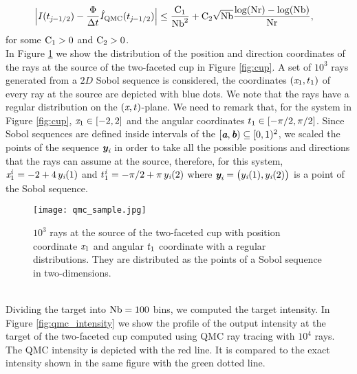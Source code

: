\begin{equation} \begin{aligned}
\Big|I(t_{\textit{j}-1/2})&-\frac{\Phi}
{\Delta t}\hat{I}_{\textrm{QMC}}(t_{\textit{j}-1/2})\Big| \leq
\frac{\textrm{C}_1}{\textrm{Nb}^2} + \textrm{C}_2\sqrt{\textrm{Nb}}\frac{\log(\textrm{Nr})-\log(\textrm{Nb})}{\textrm{Nr}},
\end{aligned}
\end{equation}
for some $\textrm{C}_1>0$ and $\textrm{C}_2>0$.
\\ \indent
In Figure \ref{fig:qmc_sample1} we show the distribution of the position and direction coordinates of the rays at the source of the two-faceted cup in Figure \ref{fig:cup}. 
A set of $10^3$ rays generated from a $2D$ Sobol sequence is considered, the coordinates $(\textit{x}_1, t_1)$ of every ray at the source are depicted with blue dots.
We note that the rays have a regular distribution on the $(\textit{x}, t)$-plane.
We need to remark that, for the system in Figure \ref{fig:cup}, $\textit{x}_1 \in[-2,2]$ and the angular coordinates $t_1 \in[-\pi/2, \pi/2]$. 
Since Sobol sequences are defined inside intervals of the  $[\textit{\textbf{a}}, \textit{\textbf{b}})\subseteq[0,1)^2$, we scaled the points of the sequence $\textit{\textbf{y}}_{\textit{i}}$ in order to take all the possible positions and directions that the rays can assume at the source, therefore, for this system, $\textit{x}_1^{\textit{i}} = -2+4\,y_{\textit{i}}(1)$ and $t_1^{\textit{i}} = -\pi/2+\pi\,y_{\textit{i}}(2)$ where 
$\textit{\textbf{y}}_{\textit{i}} = \big(y_{\textit{i}}(1), y_{\textit{i}}(2)\big)$ is a point of the Sobol sequence. 
\begin{figure}[t]
\begin{center}
    \texttt{[image: qmc\_sample.jpg]}
    \caption{$10^3$ rays at the source of the two-faceted cup with position coordinate $\textit{x}_1$ and angular $t_1$ coordinate with a regular distributions.
They are distributed as the points of a Sobol sequence in two-dimensions.}
    \label{fig:qmc_sample1}
\end{center}
  \end{figure}
\\ \indent Dividing the target into $\textrm{Nb}=100$ bins, we computed the target intensity. 
In Figure \ref{fig:qmc_intensity} we show the profile of the output intensity at the target of the two-faceted cup computed using QMC ray tracing with $10^4$ rays. 
The QMC intensity is depicted with the red line. It is compared to the exact intensity shown in the same figure with the green dotted line.
